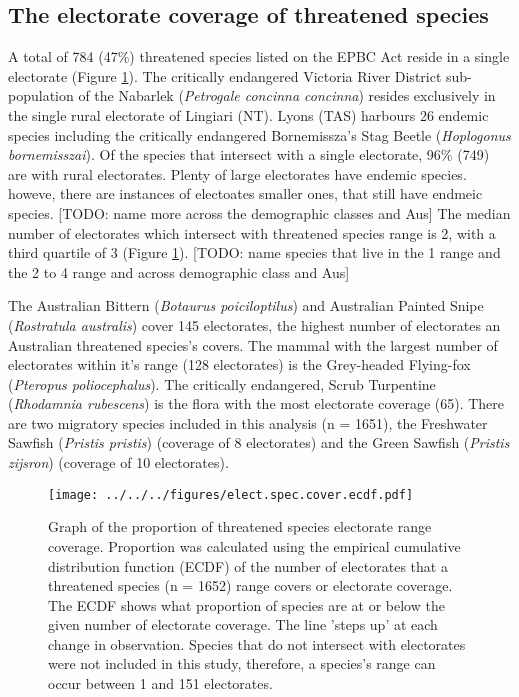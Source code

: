 \documentclass[a4paper,11pt]{article}
\begin{document}
\subsection{The electorate coverage of threatened species}

A total of 784 (47\%) threatened species listed on the EPBC Act reside in a single electorate (Figure \ref{fig:hist}).
The critically endangered Victoria River District sub-population of the Nabarlek (\emph{Petrogale concinna concinna}) resides exclusively in the single rural electorate of Lingiari (NT). Lyons (TAS) harbours 26 endemic species including the critically endangered Bornemissza's Stag Beetle (\emph{Hoplogonus bornemisszai}).
Of the species that intersect with a single electorate, 96\% (749) are with rural electorates.
Plenty of large electorates have endemic species. howeve, there are instances of electoates smaller ones, that still have endmeic species.
[TODO: name more across the demographic classes and Aus]
The median number of electorates which intersect with threatened species range is 2, with a third quartile of 3 (Figure \ref{fig:hist}).
[TODO: name species that live in the 1 range and the 2 to 4 range and across demographic class and Aus]

The Australian Bittern (\emph{Botaurus poiciloptilus}) and Australian Painted Snipe (\emph{Rostratula australis}) cover 145 electorates, the highest number of electorates an Australian threatened species's covers. The mammal with the largest number of electorates within it's range (128 electorates) is the Grey-headed Flying-fox (\emph{Pteropus poliocephalus}). The critically endangered, Scrub Turpentine (\emph{Rhodamnia rubescens}) is the flora with the most electorate coverage (65).
There are two migratory species included in this analysis (n = 1651), the Freshwater Sawfish (\emph{Pristis pristis}) (coverage of 8 electorates) and the Green Sawfish (\emph{Pristis zijsron}) (coverage of 10 electorates).


\begin{figure}[H]
	\centering
    \texttt{[image: ../../../figures/elect.spec.cover.ecdf.pdf]}
    \caption{Graph of the proportion of threatened species electorate range coverage. Proportion was calculated using the empirical cumulative distribution function (ECDF) of the number of electorates that a threatened species (n = 1652) range covers or electorate coverage. The ECDF shows what proportion of species are at or below the given number of electorate coverage. The line 'steps up' at each change in observation. Species that do not intersect with electorates were not included in this study, therefore, a species's range can occur between 1 and 151 electorates.}
    \label{fig:hist}
\end{figure}
\end{document}
